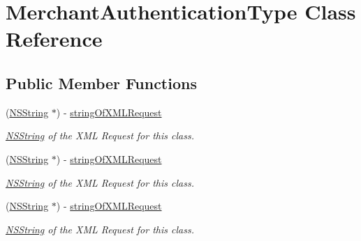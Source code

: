 \hypertarget{interface_merchant_authentication_type}{
\section{MerchantAuthenticationType Class Reference}
\label{interface_merchant_authentication_type}
}
\subsection*{Public Member Functions}
\begin{DoxyCompactItemize}
\item 
(\hyperlink{class_n_s_string}{NSString} $\ast$) -\/ \hyperlink{interface_merchant_authentication_type_a346fe55ac7f0c3fb6fd1de01d7a35819}{stringOfXMLRequest}
\begin{DoxyCompactList}\small\item\em \hyperlink{class_n_s_string}{NSString} of the XML Request for this class. \item\end{DoxyCompactList}\item 
(\hyperlink{class_n_s_string}{NSString} $\ast$) -\/ \hyperlink{interface_merchant_authentication_type_a346fe55ac7f0c3fb6fd1de01d7a35819}{stringOfXMLRequest}
\begin{DoxyCompactList}\small\item\em \hyperlink{class_n_s_string}{NSString} of the XML Request for this class. \item\end{DoxyCompactList}\item 
(\hyperlink{class_n_s_string}{NSString} $\ast$) -\/ \hyperlink{interface_merchant_authentication_type_a346fe55ac7f0c3fb6fd1de01d7a35819}{stringOfXMLRequest}
\begin{DoxyCompactList}\small\item\em \hyperlink{class_n_s_string}{NSString} of the XML Request for this class. \item\end{DoxyCompactList}\end{DoxyCompactItemize}
